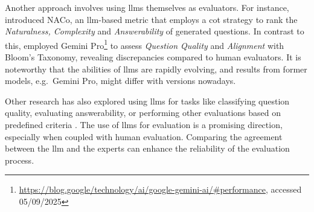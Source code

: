  Another approach involves using \ac{llms} themselves as evaluators. For instance, \cite{nguyen_reference-based_2024} introduced NACo, an \ac{llm}-based metric that employs a \ac{cot} strategy to rank the \textit{Naturalness, Complexity} and \textit{Answerability} of generated questions. In contrast to this, \cite{scaria_how_2024} employed Gemini Pro\footnote{\url{https://blog.google/technology/ai/google-gemini-ai/\#performance}, accessed 05/09/2025} to assess \textit{Question Quality} and \textit{Alignment} with Bloom's Taxonomy, revealing discrepancies compared to human evaluators. It is noteworthy that the abilities of \ac{llms} are rapidly evolving, and results from former models, e.g.\ Gemini Pro, might differ with versions nowadays. 

Other research has also explored using \ac{llms} for tasks like classifying question quality, evaluating answerability, or performing other evaluations based on predefined criteria \cite{moore_assessing_2022,scaria_how_2024,blobstein_angel_2023}. The use of \ac{llms} for evaluation is a promising direction, especially when coupled with human evaluation. Comparing the agreement between the \ac{llm} and the experts can enhance the reliability of the evaluation process.
